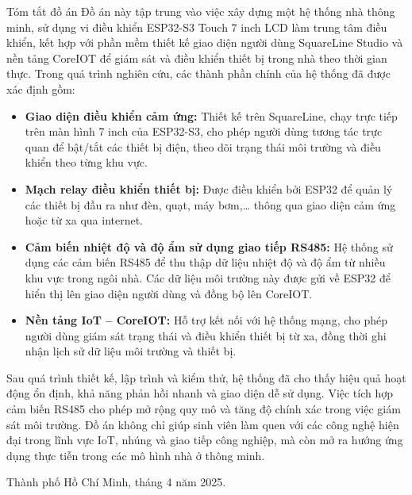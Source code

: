     \newpage
    \begin{preface}{Tóm tắt đồ án}
    \tab Đồ án này tập trung vào việc xây dựng một hệ thống nhà thông minh, sử dụng vi điều khiển ESP32-S3 Touch 7 inch LCD làm trung tâm điều khiển, kết hợp với phần mềm thiết kế giao diện người dùng SquareLine Studio và nền tảng CoreIOT để giám sát và điều khiển thiết bị trong nhà theo thời gian thực. Trong quá trình nghiên cứu, các thành phần chính của hệ thống đã được xác định gồm:
    \begin{itemize}
        \item \textbf{Giao diện điều khiển cảm ứng:} Thiết kế trên SquareLine, chạy trực tiếp trên màn hình 7 inch của ESP32-S3, cho phép người dùng tương tác trực quan để bật/tắt các thiết bị điện, theo dõi trạng thái môi trường và điều khiển theo từng khu vực.
        \item \textbf{Mạch relay điều khiển thiết bị:} Được điều khiển bởi ESP32 để quản lý các thiết bị đầu ra như đèn, quạt, máy bơm,… thông qua giao diện cảm ứng hoặc từ xa qua internet.
        \item \textbf{Cảm biến nhiệt độ và độ ẩm sử dụng giao tiếp RS485:} Hệ thống sử dụng các cảm biến RS485 để thu thập dữ liệu nhiệt độ và độ ẩm từ nhiều khu vực trong ngôi nhà. Các dữ liệu môi trường này được gửi về ESP32 để hiển thị lên giao diện người dùng và đồng bộ lên CoreIOT.
        \item \textbf{Nền tảng IoT – CoreIOT:} Hỗ trợ kết nối với hệ thống mạng, cho phép người dùng giám sát trạng thái và điều khiển thiết bị từ xa, đồng thời ghi nhận lịch sử dữ liệu môi trường và thiết bị.
    \end{itemize}
    \tab Sau quá trình thiết kế, lập trình và kiểm thử, hệ thống đã cho thấy hiệu quả hoạt động ổn định, khả năng phản hồi nhanh và giao diện dễ sử dụng. Việc tích hợp cảm biến RS485 cho phép mở rộng quy mô và tăng độ chính xác trong việc giám sát môi trường. Đồ án không chỉ giúp sinh viên làm quen với các công nghệ hiện đại trong lĩnh vực IoT, nhúng và giao tiếp công nghiệp, mà còn mở ra hướng ứng dụng thực tiễn trong các mô hình nhà ở thông minh.
    \begin{flushright}
    Thành phố Hồ Chí Minh, tháng 4 năm 2025.
    \end{flushright}
    \end{preface}